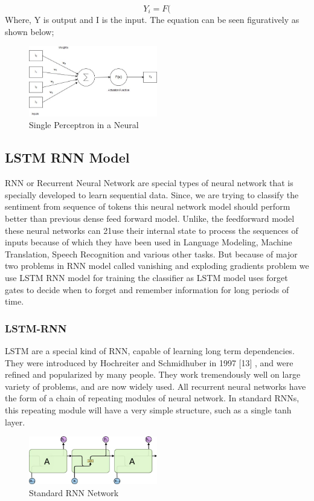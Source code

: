     $$ Y_i = F($$
Where, Y is output and I is the input.
The equation can be seen figuratively as shown below;

        \begin{figure}[hbt!]
            \centering
                \includegraphics[width=0.5\textwidth]{./img/6.12.jpg}
                \caption{Single Perceptron in a Neural }
        \end{figure}
        \subsection{LSTM RNN Model}
RNN or Recurrent Neural Network are special types of neural network that is specially
developed to learn sequential data. Since, we are trying to classify the sentiment from
sequence of tokens this neural network model should perform better than previous
dense feed forward model. Unlike, the feedforward model these neural networks can
21use their internal state to process the sequences of inputs because of which they have
been used in Language Modeling, Machine Translation, Speech Recognition and
various other tasks. But because of major two problems in RNN model called vanishing
and exploding gradients problem we use LSTM RNN model for training the classifier
as LSTM model uses forget gates to decide when to forget and remember information
for long periods of time.
            \subsubsection{LSTM-RNN}
LSTM are a special kind of RNN, capable of learning long term dependencies. They
were introduced by Hochreiter and Schmidhuber in 1997
[13]
, and were refined and
popularized by many people. They work tremendously well on large variety of
problems, and are now widely used. All recurrent neural networks have the form of a
chain of repeating modules of neural network. In standard RNNs, this repeating module
will have a very simple structure, such as a single tanh layer.
        \begin{figure}[hbt!]
            \centering
                \includegraphics[width=0.5\textwidth]{./img/6.13.jpg}
                \caption{Standard RNN Network}
        \end{figure}

